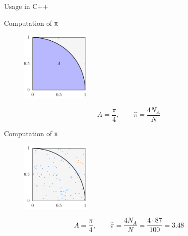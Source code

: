 \documentclass[aspectratio=169]{beamer}
\newcommand{\inputCodeBlock}[1]{%
    \begin{center}
        
    \end{center}
}
\begin{document}
    \begin{frame}{Usage in C++}
      \hspace{5em}
      \begin{minipage}[c]{0.8\textwidth}
        \inputCodeBlock{code/api.cpp}
      \end{minipage}
    \end{frame}

    \begin{frame}{Computation of π}
      \begin{figure}
        \includegraphics[width=0.3\textwidth]{plots/monte_carlo_pi_circle.pdf}
      \end{figure}
      \begin{mybox}
        \[
          A = \frac{π}{4}, \qquad \hat{π} = \frac{4 N_A}{N}
        \]
      \end{mybox}
    \end{frame}

    \begin{frame}{Computation of π}
      \begin{figure}
        \includegraphics[width=0.3\textwidth]{figures/monte_carlo_pi_100_87.pdf}
      \end{figure}
      \begin{mybox}
        \[
          A = \frac{π}{4}, \qquad \hat{π} = \frac{4 N_A}{N} = \frac{4 \cdot 87}{100} = 3.48
        \]
      \end{mybox}
    \end{frame}
\end{document}
